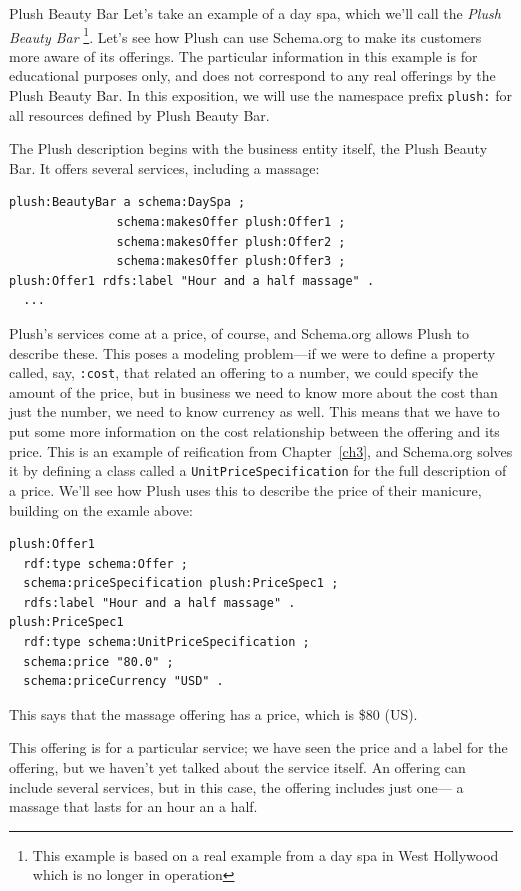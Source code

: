 \begin{example}{Plush Beauty Bar}
\label{Plushex}
Let's take an example of a day spa, which we'll call the 
\emph{Plush Beauty Bar} \footnote{This example is based on a real example from 
a day spa in West Hollywood which is no longer in operation}.   Let's see how
Plush can use Schema.org to make its customers more aware of its
offerings. 
The particular information in this example is
for educational purposes only, and does not correspond to any real
offerings by the Plush Beauty Bar. In this exposition, we will use the
namespace prefix \texttt{plush:} for all resources defined by Plush Beauty Bar.

The Plush description begins with the business entity itself, the
Plush Beauty Bar. It offers several services,
including a massage:

\begin{lstlisting}
plush:BeautyBar a schema:DaySpa ;
               schema:makesOffer plush:Offer1 ;
               schema:makesOffer plush:Offer2 ;
               schema:makesOffer plush:Offer3 ;
plush:Offer1 rdfs:label "Hour and a half massage" .
  ...
\end{lstlisting}


Plush's services come at a price, of course, and Schema.org allows Plush to
describe these.   This poses a modeling problem---if we were to
define a property called, say, \texttt{:cost}, that related an offering to a
number, we could specify the amount of the price, but in business we
need to know more about the cost than just the number, we need to know
currency as well. This means that we have to put some more information
on the cost relationship between the offering and its price. This is an
example of reification from Chapter~\ref{ch3}, and Schema.org
solves it by defining a
class called a \texttt{UnitPriceSpecification} for the full description of a
price. We'll see how Plush uses this to describe the price of their
manicure, building on the examle above:

\begin{lstlisting}
plush:Offer1
  rdf:type schema:Offer ;
  schema:priceSpecification plush:PriceSpec1 ;
  rdfs:label "Hour and a half massage" .
plush:PriceSpec1
  rdf:type schema:UnitPriceSpecification ;
  schema:price "80.0" ;
  schema:priceCurrency "USD" .
\end{lstlisting}

This says that the massage offering has a price, which is \$80 (US).

This offering is for a particular service; we have seen the price and 
a label for the offering, 
but we haven't yet talked about the service itself.  An
offering can include several services, but in this case, the offering
includes just one--- a massage that lasts for an hour an a half.  


\end{example}
